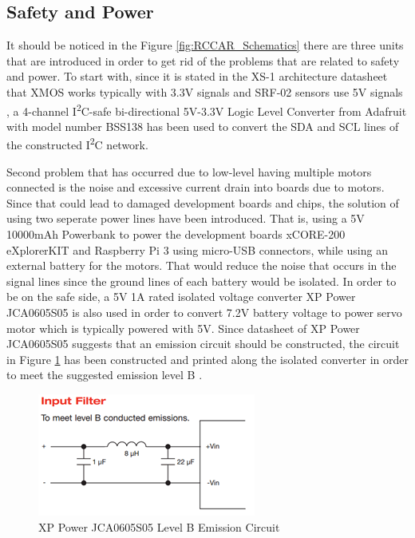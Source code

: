 \subsection{Safety and Power}
It should be noticed in the Figure \ref{fig:RCCAR_Schematics} there are three units that are introduced in order to get rid of the problems that are related to safety and power. To start with, since it is stated in the XS-1 architecture datasheet \cite{xmosdatasheet} that XMOS works typically with 3.3V signals and SRF-02 sensors use 5V signals \cite{srf02datasheet}, a 4-channel I\textsuperscript{2}C-safe bi-directional 5V-3.3V Logic Level Converter from Adafruit with model number BSS138 \cite{adafruitlevelconverter} has been used to convert the SDA and SCL lines of the constructed I\textsuperscript{2}C network. 

Second problem that has occurred due to low-level having multiple motors connected is the noise and excessive current drain into boards due to motors. Since that could lead to damaged development boards and chips, the solution of using two seperate power lines have been introduced. That is, using a 5V 10000mAh Powerbank to power the development boards xCORE-200 eXplorerKIT and Raspberry Pi 3 using micro-USB connectors, while using an external battery for the motors. That would reduce the noise that occurs in the signal lines since the ground lines of each battery would be isolated. In order to be on the safe side, a 5V 1A rated isolated voltage converter XP Power JCA0605S05 \cite{isolatedvoltageconverter} is also used in order to convert 7.2V battery voltage to power servo motor which is typically powered with 5V. Since datasheet of XP Power JCA0605S05 suggests that an emission circuit should be constructed, the circuit in Figure \ref{fig:emissionckt} has been constructed and printed along the isolated converter in order to meet the suggested emission level B \cite{isolatedvoltageconverter}.
\begin{figure}[!ht]
	\includegraphics[scale=1.5]{content/images/emissionckt.png}
	\caption{XP Power JCA0605S05 Level B Emission Circuit \cite{isolatedvoltageconverter}}
	\label{fig:emissionckt}
\end{figure}

